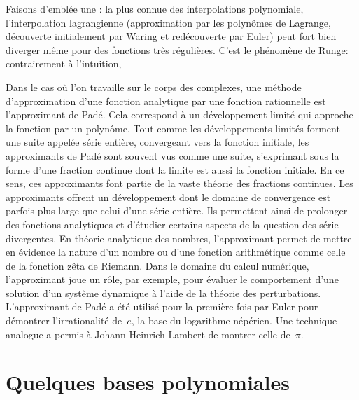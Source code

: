 Faisons d'emblée une : la plus connue des interpolations polynomiale, l'interpolation lagrangienne (approximation par les polynômes de Lagrange, découverte initialement par Waring et redécouverte par Euler) peut fort bien diverger même pour des fonctions très régulières. C'est le phénomène de Runge: contrairement à l'intuition, 

 Dans le cas où l'on travaille sur le corps des complexes, une méthode d'approximation d'une fonction analytique par une fonction rationnelle est l'approximant de Padé. Cela correspond à un développement limité qui approche la fonction par un polynôme. Tout comme les développements limités forment une suite appelée série entière, convergeant vers la fonction initiale, les approximants de Padé sont souvent vus comme une suite, s'exprimant sous la forme d'une fraction continue dont la limite est aussi la fonction initiale. En ce sens, ces approximants font partie de la vaste théorie des fractions continues. Les approximants offrent un développement dont le domaine de convergence est parfois plus large que celui d'une série entière. Ils permettent ainsi de prolonger des fonctions analytiques et d'étudier certains aspects de la question des série divergentes. En théorie analytique des nombres, l'approximant permet de mettre en évidence la nature d'un nombre ou d'une fonction arithmétique comme celle de la fonction zêta de Riemann. Dans le domaine du calcul numérique, l'approximant joue un rôle, par exemple, pour évaluer le comportement d'une solution d'un système dynamique à l'aide de la théorie des perturbations. L'approximant de Padé a été utilisé pour la première fois par Euler pour démontrer l'irrationalité de~$e$, la base du logarithme népérien. Une technique analogue a permis à Johann Heinrich Lambert de montrer celle de~$\pi$.



\section{Quelques bases polynomiales} 
